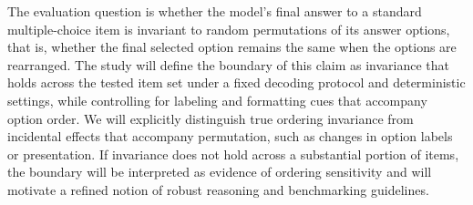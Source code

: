 
The evaluation question is whether the model’s final answer to a standard multiple-choice item is invariant to random permutations of its answer options, that is, whether the final selected option remains the same when the options are rearranged. The study will define the boundary of this claim as invariance that holds across the tested item set under a fixed decoding protocol and deterministic settings, while controlling for labeling and formatting cues that accompany option order. We will explicitly distinguish true ordering invariance from incidental effects that accompany permutation, such as changes in option labels or presentation. If invariance does not hold across a substantial portion of items, the boundary will be interpreted as evidence of ordering sensitivity and will motivate a refined notion of robust reasoning and benchmarking guidelines.
